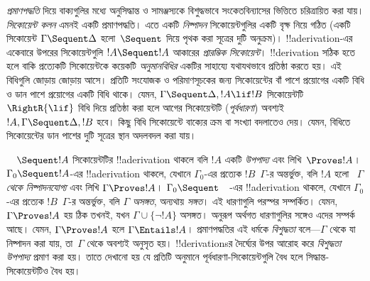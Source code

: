 \emph{প্রমাণপদ্ধতি} দিয়ে বাক্যগুলির মধ্যে অনুসিদ্ধান্ত ও
সামঞ্জস্যকে বিশুদ্ধভাবে সংকেতবিন্যাসের ভিত্তিতে চরিত্রায়িত করা
যায়। \emph{সিকোয়েন্ট কলন} এমনই একটি প্রমাণপদ্ধতি। এতে একটি
\emph{নিষ্পাদন} সিকোয়েন্টগুলির একটি বৃক্ষ নিয়ে গঠিত (একটি
সিকোয়েন্ট $\Gamma \Sequent \Delta$ হলো~$\Sequent$ দিয়ে পৃথক
করা সূত্রের দুটি অনুক্রম)। !!a{derivation}-এর একেবারে উপরের
সিকোয়েন্টগুলি $!A \Sequent !A$ আকারের \emph{প্রারম্ভিক সিকোয়েন্ট}।
!!{derivation} সঠিক হতে হলে বাকি প্রত্যেকটি সিকোয়েন্টকে কয়েকটি
\emph{অনুমানবিধির} একটির সাহায্যে যথাযথভাবে প্রতিষ্ঠা করতে হয়।
এই বিধিগুলি জোড়ায় জোড়ায় আসে। প্রতিটি সংযোজক ও পরিমাণসূচকের
জন্য সিকোয়েন্টের বাঁ পাশে প্রয়োগের একটি বিধি ও ডান পাশে
প্রয়োগের একটি বিধি থাকে। যেমন, $\Gamma \Sequent \Delta, !A \lif !B$
সিকোয়েন্টটি $\RightR{\lif}$ বিধি দিয়ে প্রতিষ্ঠা করা হলে
আগের সিকোয়েন্টটি (\emph{পূর্বধারণা}) অবশ্যই
$!A, \Gamma \Sequent \Delta, !B$ হবে। কিছু বিধি সিকোয়েন্টে
বাক্যের ক্রম বা সংখ্যা বদলাতেও দেয়। যেমন, \RightR{\Exchange}
বিধিতে সিকোয়েন্টের ডান পাশের দুটি সূত্রের স্থান অদলবদল করা যায়।

$\quad \Sequent !A$ সিকোয়েন্টটির !!a{derivation} থাকলে
বলি $!A$ একটি \emph{উপপাদ্য} এবং লিখি~$\Proves !A$।
$\Gamma_0 \Sequent !A$-এর !!a{derivation} থাকলে, যেখানে
$\Gamma_0$-এর প্রত্যেক $!B$~$\Gamma$-র অন্তর্ভুক্ত, বলি $!A$ হলো
~$\Gamma$ \emph{থেকে নিষ্পাদনযোগ্য} এবং লিখি $\Gamma \Proves !A$।
$\Gamma_0 \Sequent \quad$-এর !!a{derivation} থাকলে, যেখানে
$\Gamma_0$-এর প্রত্যেক $!B$~$\Gamma$-র অন্তর্ভুক্ত, বলি $\Gamma$
\emph{অসঙ্গত}, অন্যথায় \emph{সঙ্গত}। এই ধারণাগুলি পরস্পর
সম্পর্কিত। যেমন, $\Gamma \Proves !A$ হয় ঠিক তখনই, যখন
$\Gamma \cup \{\lnot !A\}$ অসঙ্গত। অনুরূপ অর্থগত ধারণাগুলির সঙ্গেও
এদের সম্পর্ক আছে। যেমন, $\Gamma \Proves !A$ হলে $\Gamma \Entails !A$।
প্রমাণপদ্ধতির এই ধর্মকে \emph{বিশুদ্ধতা} বলে—$\Gamma$ থেকে যা
নিষ্পাদন করা যায়, তা~$\Gamma$ থেকে অবশ্যই অনুসৃত হয়।
!!{derivation}sর দৈর্ঘ্যের উপর আরোহ করে \emph{বিশুদ্ধতা
উপপাদ্য} প্রমাণ করা হয়। তাতে দেখানো হয় যে প্রতিটি অনুমানে
পূর্বধারণা-সিকোয়েন্টগুলি বৈধ হলে সিদ্ধান্ত-সিকোয়েন্টটিও বৈধ হয়।
